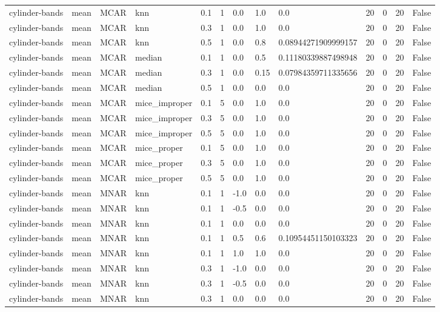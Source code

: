 \begin{tabular}{lllllllllllll}
cylinder-bands & mean & MCAR & knn & 0.1 & 1 & 0.0 & 1.0 & 0.0 & 20 & 0 & 20 & False \\
cylinder-bands & mean & MCAR & knn & 0.3 & 1 & 0.0 & 1.0 & 0.0 & 20 & 0 & 20 & False \\
cylinder-bands & mean & MCAR & knn & 0.5 & 1 & 0.0 & 0.8 & 0.08944271909999157 & 20 & 0 & 20 & False \\
cylinder-bands & mean & MCAR & median & 0.1 & 1 & 0.0 & 0.5 & 0.11180339887498948 & 20 & 0 & 20 & False \\
cylinder-bands & mean & MCAR & median & 0.3 & 1 & 0.0 & 0.15 & 0.07984359711335656 & 20 & 0 & 20 & False \\
cylinder-bands & mean & MCAR & median & 0.5 & 1 & 0.0 & 0.0 & 0.0 & 20 & 0 & 20 & False \\
cylinder-bands & mean & MCAR & mice\_improper & 0.1 & 5 & 0.0 & 1.0 & 0.0 & 20 & 0 & 20 & False \\
cylinder-bands & mean & MCAR & mice\_improper & 0.3 & 5 & 0.0 & 1.0 & 0.0 & 20 & 0 & 20 & False \\
cylinder-bands & mean & MCAR & mice\_improper & 0.5 & 5 & 0.0 & 1.0 & 0.0 & 20 & 0 & 20 & False \\
cylinder-bands & mean & MCAR & mice\_proper & 0.1 & 5 & 0.0 & 1.0 & 0.0 & 20 & 0 & 20 & False \\
cylinder-bands & mean & MCAR & mice\_proper & 0.3 & 5 & 0.0 & 1.0 & 0.0 & 20 & 0 & 20 & False \\
cylinder-bands & mean & MCAR & mice\_proper & 0.5 & 5 & 0.0 & 1.0 & 0.0 & 20 & 0 & 20 & False \\
cylinder-bands & mean & MNAR & knn & 0.1 & 1 & -1.0 & 0.0 & 0.0 & 20 & 0 & 20 & False \\
cylinder-bands & mean & MNAR & knn & 0.1 & 1 & -0.5 & 0.0 & 0.0 & 20 & 0 & 20 & False \\
cylinder-bands & mean & MNAR & knn & 0.1 & 1 & 0.0 & 0.0 & 0.0 & 20 & 0 & 20 & False \\
cylinder-bands & mean & MNAR & knn & 0.1 & 1 & 0.5 & 0.6 & 0.10954451150103323 & 20 & 0 & 20 & False \\
cylinder-bands & mean & MNAR & knn & 0.1 & 1 & 1.0 & 1.0 & 0.0 & 20 & 0 & 20 & False \\
cylinder-bands & mean & MNAR & knn & 0.3 & 1 & -1.0 & 0.0 & 0.0 & 20 & 0 & 20 & False \\
cylinder-bands & mean & MNAR & knn & 0.3 & 1 & -0.5 & 0.0 & 0.0 & 20 & 0 & 20 & False \\
cylinder-bands & mean & MNAR & knn & 0.3 & 1 & 0.0 & 0.0 & 0.0 & 20 & 0 & 20 & False \\

\end{tabular}
